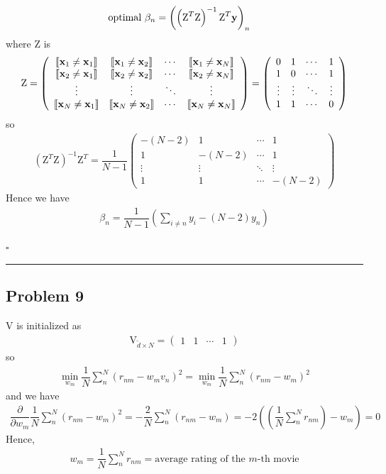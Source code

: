 \documentclass[12pt]{article}
\newcommand*{\QEDB}{\hfill\ensuremath{\square}}
\newcommand{\BooBrackets}[1]{\left\llbracket#1\right\rrbracket}
\newcommand{\ParTh}[1]{\left(#1\right)}
\newcommand{\BF}[1]{{\bf#1}}
\newcommand{\Matrix}[2]{\ParTh{\begin{array}{#1}#2\end{array}}}
\newcommand{\horrule}[1]{\rule{\linewidth}{#1}}
\begin{document}
\begin{align}
\text{optimal }\beta_n&=\ParTh{\ParTh{\text{Z}^T\text{Z}}^{-1}\text{Z}^T\BF{y}}_n
\end{align}
where $\text{Z}$ is
\begin{align}
\text{Z}=\Matrix{cccc}{\BooBrackets{\BF{x}_1\neq\BF{x}_1}&\BooBrackets{\BF{x}_1\neq\BF{x}_2}&\cdots&\BooBrackets{\BF{x}_1\neq\BF{x}_N}\\\BooBrackets{\BF{x}_2\neq\BF{x}_1}&\BooBrackets{\BF{x}_2\neq\BF{x}_2}&\cdots&\BooBrackets{\BF{x}_2\neq\BF{x}_N}\\\vdots&\vdots&\ddots&\vdots\\\BooBrackets{\BF{x}_N\neq\BF{x}_1}&\BooBrackets{\BF{x}_N\neq\BF{x}_2}&\cdots&\BooBrackets{\BF{x}_N\neq\BF{x}_N}}=\Matrix{cccc}{0&1&\cdots&1\\1&0&\cdots&1\\\vdots&\vdots&\ddots&\vdots\\1&1&\cdots&0}
\end{align}
so
\begin{align}
\label{8-1}
\ParTh{\text{Z}^T\text{Z}}^{-1}\text{Z}^T=\dfrac{1}{N-1}\Matrix{cccc}{-\ParTh{N-2}&1&\cdots&1\\1&-\ParTh{N-2}&\cdots&1\\\vdots&\vdots&\ddots&\vdots\\1&1&\cdots&-\ParTh{N-2}}
\end{align}
Hence we have
\begin{align}
\beta_n=\dfrac{1}{N-1}\ParTh{\sum_{i\neq n}y_i-\ParTh{N-2}y_n}
\end{align}

\QEDB

\horrule{0.5pt}

\subsection*{Problem 9}

$\text{V}$ is initialized as
\begin{align}
\text{V}_{\tilde{d}\times N}=\Matrix{cccc}{1&1&\cdots&1}
\end{align}
so
\begin{align}
\min_{w_m}\dfrac{1}{N}\sum_{n}^{N}\ParTh{r_{nm}-w_mv_n}^2=\min_{w_m}\dfrac{1}{N}\sum_{n}^{N}\ParTh{r_{nm}-w_m}^2
\end{align}
and we have
\begin{align}
\dfrac{\partial}{\partial w_m}\dfrac{1}{N}\sum_{n}^{N}\ParTh{r_{nm}-w_m}^2=-\dfrac{2}{N}\sum_{n}^{N}\ParTh{r_{nm}-w_m}=-2\ParTh{\ParTh{\dfrac{1}{N}\sum_{n}^{N}r_{nm}}-w_m}=0
\end{align}
Hence,
\begin{align}
w_m=\dfrac{1}{N}\sum_{n}^{N}r_{nm}=\text{average rating of the }m\text{-th movie}
\end{align}
\end{document}
